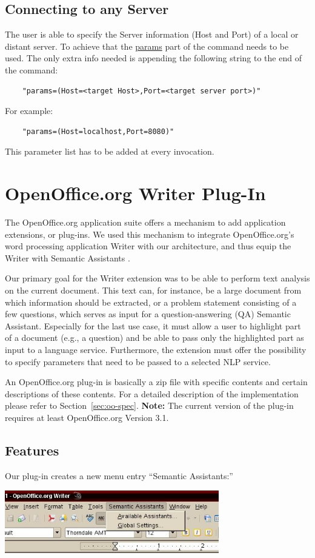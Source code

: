\subsection*{Connecting to any Server}
The user is able to specify the Server information (Host and Port) of
a local or distant server.  To achieve that the \url{params} part of the
command needs to be used.  The only extra info needed is appending the
following string to the end of the command:
\begin{verbatim}
    "params=(Host=<target Host>,Port=<target server port>)"
\end{verbatim}

For example:
\begin{verbatim}
    "params=(Host=localhost,Port=8080)"
\end{verbatim}

This parameter list has to be added at every invocation.

\section{OpenOffice.org Writer Plug-In}
The OpenOffice.org application suite offers a mechanism
to add application extensions, or plug-ins. We used this
mechanism to integrate OpenOffice.org's word processing
application Writer with our architecture, and thus equip the
Writer with Semantic Assistants \citep{giwi08}.

Our primary goal for the Writer extension was to be able
to perform text analysis on the current document. This
text can, for instance, be a large document from which
information should be extracted, or a problem statement
consisting of a few questions, which serves as input for a
question-answering (QA) Semantic Assistant. Especially
for the last use case, it must allow a user to highlight part of
a document (e.g., a question) and be able to pass only the
highlighted part as input to a language service. Furthermore,
the extension must offer the possibility to specify parameters
that need to be passed to a selected NLP service.

An OpenOffice.org plug-in is basically a zip file with specific
contents and certain descriptions of these contents.  For a detailed
description of the implementation please refer to
Section~\ref{sec:oo-spec}. \textbf{Note:} The current version of the
plug-in requires at least OpenOffice.org Version 3.1.


\subsection{Features}
Our plug-in creates a new menu entry ``Semantic Assistants:''
\begin{center}
\includegraphics[width=0.7\textwidth]{pictures/oomenu.jpg}
\end{center}

